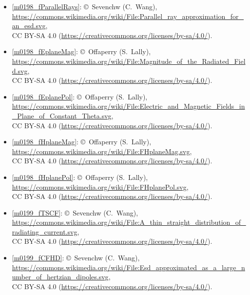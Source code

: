\begin{itemize}
\item[Fig.] \label{m0198_fParallelRays_Credit}
  \ref{m0198_fParallelRays}:
  \copyright~Sevenchw (C.\ Wang), 
  \url{https://commons.wikimedia.org/wiki/File:Parallel_ray_approximation_for_an_esd.svg},\\ 
  CC BY-SA 4.0 (\url{https://creativecommons.org/licenses/by-sa/4.0/}).

\item[Fig.] \label{m0198_fEplaneMag_Credit}
  \ref{m0198_fEplaneMag}:
  \copyright~Offaperry (S.\ Lally), 
  \url{https://commons.wikimedia.org/wiki/File:Magnitude_of_the_Radiated_Field.svg},\\ 
  CC BY-SA 4.0 (\url{https://creativecommons.org/licenses/by-sa/4.0/}).

\item[Fig.] \label{m0198_fEplanePol_Credit}
  \ref{m0198_fEplanePol}:
  \copyright~Offaperry (S.\ Lally), 
  \url{https://commons.wikimedia.org/wiki/File:Electric_and_Magnetic_Fields_in_Plane_of_Constant_Theta.svg},\\ 
  CC BY-SA 4.0 (\url{https://creativecommons.org/licenses/by-sa/4.0/}).

\item[Fig.] \label{m0198_fHplaneMag_Credit}
  \ref{m0198_fHplaneMag}:
  \copyright~Offaperry (S.\ Lally), 
  \url{https://commons.wikimedia.org/wiki/File:FHplaneMag.svg},\\ 
  CC BY-SA 4.0 (\url{https://creativecommons.org/licenses/by-sa/4.0/}).

\item[Fig.] \label{m0198_fHplanePol_Credit}
  \ref{m0198_fHplanePol}:
  \copyright~Offaperry (S.\ Lally), 
  \url{https://commons.wikimedia.org/wiki/File:FHplanePol.svg},\\ 
  CC BY-SA 4.0 (\url{https://creativecommons.org/licenses/by-sa/4.0/}).

\item[Fig.] \label{m0199_fTSCF_Credit}
  \ref{m0199_fTSCF}:
  \copyright~Sevenchw (C.\ Wang), 
  \url{https://commons.wikimedia.org/wiki/File:A_thin_straight_distribution_of_radiating_current.svg},\\ 
  CC BY-SA 4.0 (\url{https://creativecommons.org/licenses/by-sa/4.0/}).

\item[Fig.] \label{m0199_fCFHD_Credit}
  \ref{m0199_fCFHD}:
  \copyright~Sevenchw (C.\ Wang), 
  \url{https://commons.wikimedia.org/wiki/File:Esd_approximated_as_a_large_number_of_hertzian_dipoles.svg},\\ 
  CC BY-SA 4.0 (\url{https://creativecommons.org/licenses/by-sa/4.0/}).


\end{itemize}
